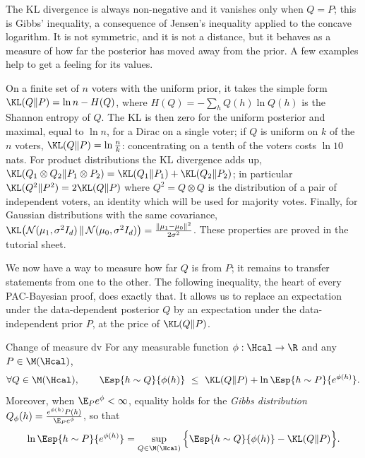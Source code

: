 The KL divergence is always non-negative and it vanishes only when $Q=P$; this
is Gibbs' inequality, a consequence of Jensen's inequality applied to the
concave logarithm. It is not symmetric, and it is not a distance, but it
behaves as a measure of how far the posterior has moved away from the prior.
A few examples help to get a feeling for its values.

On a finite set of $n$ voters with the uniform prior, it takes the simple form
$\KL(Q\|P)=\ln n-H(Q)$, where $H(Q)=-\sum_hQ(h)\ln Q(h)$ is the Shannon entropy
of $Q$. The KL is then zero for the uniform posterior and maximal, equal to
$\ln n$, for a Dirac on a single voter; if $Q$ is uniform on $k$ of the $n$
voters, $\KL(Q\|P)=\ln\frac nk$: concentrating on a tenth of the voters costs
$\ln 10$ nats. For product distributions the KL divergence
adds up, $\KL(Q_1\otimes Q_2\|P_1\otimes P_2)=\KL(Q_1\|P_1)+\KL(Q_2\|P_2)$; in
particular $\KL(Q^2\|P^2)=2\KL(Q\|P)$ where $Q^2=Q\otimes Q$ is the distribution
of a pair of independent voters, an identity which will be used for majority
votes. Finally, for Gaussian distributions with the same covariance,
$\KL\big(\mathcal N(\mu_1,\sigma^2 I_d)\,\|\,\mathcal N(\mu_0,\sigma^2 I_d)\big)=\frac{\|\mu_1-\mu_0\|^2}{2\sigma^2}$.
These properties are proved in the tutorial sheet.

We now have a way to measure how far $Q$ is from $P$; it remains to transfer
statements from one to the other. The following inequality, the heart of every
PAC-Bayesian proof, does exactly that. It allows
us to replace an expectation under the data-dependent posterior $Q$ by an
expectation under the data-independent prior $P$, at the price of $\KL(Q\|P)$.

\begin{lemma}{Change of measure \citep{donsker1975asymptotic,csiszar1975divergence}}{dv}
For any measurable function $\phi:\Hcal\to\R$ and any $P\in\M(\Hcal)$,
\begin{equation}\label{eq:dv}
  \forall Q\in\M(\Hcal),\qquad
  \Esp{h\sim Q}{\phi(h)}\ \leq\ \KL(Q\|P)+\ln\Esp{h\sim P}{e^{\phi(h)}}.
\end{equation}
Moreover, when $\E_P e^{\phi}<\infty$, equality holds for the
\emph{Gibbs distribution} $Q_\phi(h)=\frac{e^{\phi(h)}P(h)}{\E_{P}e^{\phi}}$, so that
\begin{equation}\label{eq:gibbs_variational}
  \ln\Esp{h\sim P}{e^{\phi(h)}}=\sup_{Q\in\M(\Hcal)}\Big\{\Esp{h\sim Q}{\phi(h)}-\KL(Q\|P)\Big\}.
\end{equation}
\end{lemma}

